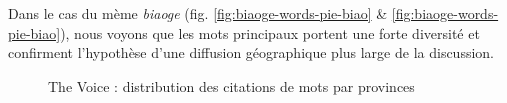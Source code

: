 Dans le cas du mème \textit{biaoge} (fig. \ref{fig:biaoge-words-pie-biao} \& \ref{fig:biaoge-words-pie-biao}), nous voyons que les mots principaux portent une forte diversité et confirment l{\textquoteright}hypothèse d{\textquoteright}une diffusion géographique plus large de la discussion.

\begin{figure}[htbp]
    \centering

    \newline
    \caption{
      The Voice : distribution des citations de mots par provinces 
    }
    \label{fig:voice-words-pie}
\end{figure}


